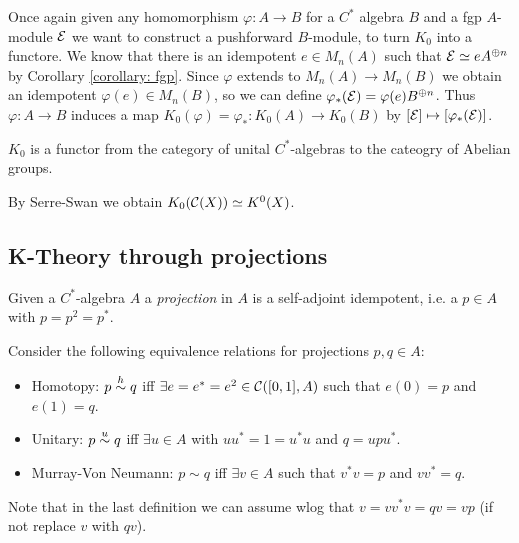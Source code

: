 \noindent Once again given any homomorphism $\varphi\colon A\to B$ for a $C^\ast$ algebra $B$ and a fgp $A$-module $\mathcal{E}$ we want to construct a pushforward $B$-module, to turn $K_0$ into a functore. We know that there is an idempotent $e\in M_n(A)$ such that $\mathcal{E}\simeq eA^{\oplus n}$ by Corollary \eqref{corollary: fgp}. Since $\varphi$ extends to $M_n(A)\to M_n(B)$ we obtain an idempotent $\varphi(e)\in M_n(B)$, so we can define $\varphi_\ast(\mathcal{E})=\varphi(e)B^{\oplus n}$. Thus $\varphi\colon A\to B$ induces a map $K_0(\varphi)=\varphi_\ast\colon K_0(A)\to K_0(B)$ by $[\mathcal{E}]\mapsto[\varphi_\ast(\mathcal{E})]$.

\begin{fact}
 $K_0$ is a functor from the category of unital $C^\ast$-algebras to the cateogry of Abelian groups.
\end{fact}

\begin{lemma}
 By Serre-Swan we obtain $K_0(\mathcal{C}(X))\simeq K^0(X)$.
\end{lemma}

\subsection{K-Theory through projections}
\begin{definition}
 Given a $C^\ast$-algebra $A$ a \emph{projection} in $A$ is a self-adjoint idempotent, i.e. a $p\in A$ with $p=p^2=p^\ast$.
\end{definition}

\begin{definition}
 Consider the following equivalence relations for projections $p,q\in A$:
 \begin{itemize}
  \item Homotopy: $p\stackrel{h}{\sim} q$ iff $\exists e=e^\ast=e^2\in\mathcal{C}([0,1],A)$ such that $e(0)=p$ and $e(1)=q$.
  \item Unitary: $p\stackrel{u}{\sim} q$ iff $\exists u\in A$ with $uu^\ast=1=u^\ast u$ and $q=upu^\ast$.
  \item Murray-Von Neumann: $p\sim q$ iff $\exists v\in A$ such that $v^\ast v=p$ and $vv^\ast=q$.
 \end{itemize}
 Note that in the last definition we can assume wlog that $v=vv^\ast v=qv=vp$ (if not replace $v$ with $qv$).
\end{definition}

